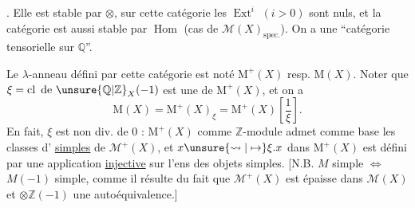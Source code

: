 . Elle est stable par $\otimes$,
sur cette catégorie les $\operatorname{Ext}^i$ $(i>0)$ sont
nuls, et la catégorie est aussi stable
par $\operatorname{Hom}$ (cas de $\mathcal{M}(X)_{\mathrm{spec.}}$). On a
une ``catégorie tensorielle sur $\mathbb{Q}$''.

Le  $\lambda$-anneau défini par cette
catégorie est noté $\mathrm{M}^+(X)$ resp. $\mathrm{M}(X)$.
Noter que $\xi=\operatorname{cl}\text{ de }\unsure{\mathbb{Q}|\mathbb{Z}}_X(-1)$ est une
 de $\mathrm{M}^+(X)$, et on a
\[
\mathrm{M}(X)=\mathrm{M}^+(X)_\xi=\mathrm{M}^+(X)\left[\frac1\xi\right].
\]
En fait, $\xi$ est non div. de $0$ :
$\mathrm{M}^+(X)$ comme $\mathbb{Z}$-module admet comme
base les classes d' \uline{simples} de
$\mathcal{M}^+(X)$, et $x\unsure{\rightsquigarrow|\mapsto}\xi.x$ dans $\mathrm{M}^+(X)$ est défini
par une application \uline{injective} sur l'ens des
objets simples. [N.B. $M$ simple 
$\Longleftrightarrow$ 
$M(-1)$ simple, comme il résulte du
fait que $\mathcal{M}^+(X)$ est épaisse dans $\mathcal{M}(X)$ et
$\otimes\mathbb{Z}(-1)$ une autoéquivalence.]
